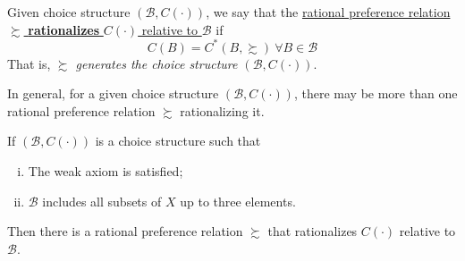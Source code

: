 \documentclass{article}
\begin{document}
		\begin{definition}[1.D.1]
			Given choice structure $(\mathscr{B}, C(\cdot))$, we say that the \ul{rational preference relation $\succsim$ \textbf{rationalizes} $C(\cdot)$ relative to $\mathscr{B}$} if
			\begin{equation}
				C(B) = C^*(B, \succsim)\ \forall B \in \mathscr{B}
			\end{equation}
			That is, \emph{$\succsim$ generates the choice structure $(\mathscr{B}, C(\cdot))$}.
		\end{definition}
		
		\begin{remark}
			In general, for a given choice structure $(\mathscr{B}, C(\cdot))$, there may be more than one rational preference relation $\succsim$ rationalizing it.
		\end{remark}
		
		\begin{proposition}
			If $(\mathscr{B}, C(\cdot))$ is a choice structure such that
			\begin{enumerate}[(i)]
				\item The weak axiom is satisfied;
				\item $\mathscr{B}$ includes all subsets of $X$ up to three elements.
			\end{enumerate}
			Then there is a rational preference relation $\succsim$ that rationalizes $C(\cdot)$ relative to $\mathscr{B}$.
		\end{proposition}
\end{document}
